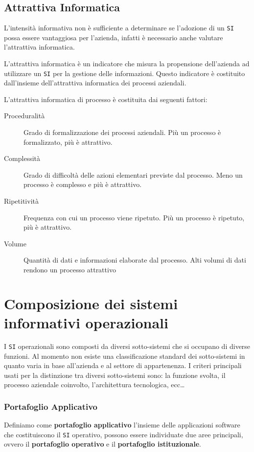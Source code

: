    \subsection{Attrattiva Informatica}
        L'intensità informativa non è sufficiente a determinare se l'adozione di un \texttt{SI} possa essere vantaggiosa per l'azienda, infatti è necessario anche valutare l'attrattiva informatica.
        \begin{definition}
            L'attrattiva informatica è un indicatore che misura la propensione dell'azienda ad utilizzare un \texttt{SI} per la gestione delle informazioni. Questo indicatore è costituito dall'insieme dell'attrattiva informatica dei processi aziendali.
        \end{definition}
        \begin{definition}
            L'attrattiva informatica di processo è costituita dai seguenti fattori:
            \begin{description}
                \item[Proceduralità] Grado di formalizzazione dei processi aziendali. Più un processo è formalizzato, più è attrattivo.
                \item[Complessità] Grado di difficoltà delle azioni elementari previste dal processo. Meno un processo è complesso e più è attrattivo.
                \item[Ripetitività] Frequenza con cui un processo viene ripetuto. Più un processo è ripetuto, più è attrattivo.
                \item[Volume] Quantità di dati e informazioni elaborate dal processo. Alti volumi di dati rendono un processo attrattivo         
            \end{description}
        \end{definition}
\section[Composizione dei \texttt{SI} Operazionali]{Composizione dei sistemi informativi operazionali}
    I \texttt{SI} operazionali sono composti da diversi sotto-sistemi che si occupano di diverse funzioni. Al momento non esiste una classificazione standard dei sotto-sistemi in quanto varia in base all'azienda e al settore di appartenenza. I criteri principali usati per la distinzione tra diversi sotto-sistemi sono: la funzione svolta, il processo aziendale coinvolto, l'architettura tecnologica, ecc\dots
    \subsubsection{Portafoglio Applicativo}
        Definiamo come \textbf{portafoglio applicativo} l'insieme delle applicazioni software che costituiscono il \texttt{SI} operativo, possono essere individuate due aree principali, ovvero il \textbf{portafoglio operativo} e il \textbf{portafoglio istituzionale}.
